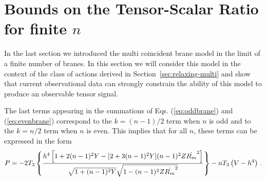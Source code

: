 % 
% 
\section{Bounds on the Tensor-Scalar Ratio for finite $n$} 
\label{sec:multibounds-multi}
In the last section we introduced the multi coincident brane model in the limit
of a finite number of branes. In this section we will consider this model in
the context of the class of actions derived in Section~\ref{sec:relaxing-multi}
and show that current observational data can strongly constrain the ability of
this model to produce an observable tensor signal.

The last terms appearing in the summations of Eqs. (\ref{eq:oddbrane}) 
and (\ref{eq:evenbrane}) correspond  to the $k=(n-1)/2$ 
term when $n$ is odd and to the $k=n/2$ term when $n$ is even. This 
implies that for all $n$, these terms can be expressed in the form 
% 
\begin{equation}
\label{eq:unifiedgenP-multi}
P = -2T_3 \left\{ \frac{h^4 \left[ 1+2(n-1)^2Y
- [ 2+3(n-1)^2Y] (n-1)^2Z\dot{R_m}^2  \right]}{\sqrt{1+(n-1)^2Y}
\sqrt{1-(n-1)^2Z\dot{R_m}^2}} 
 \right\} -n T_3 \left( V -h^4 \right) \,.
\end{equation}
% 


